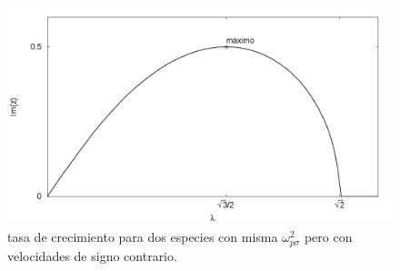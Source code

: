 \documentclass[12pt]{article}
\begin{document}
\begin{figure}
\includegraphics[height=0.3\paperheight]{grafica_misma_omega_contrarias.png}
\caption{tasa de crecimiento para dos especies con misma $\omega_{p\sigma}^2$ pero con velocidades de signo contrario.}
\label{fig:misma_omega_tasa_de_crecimiento}
\end{figure}
\end{document}
